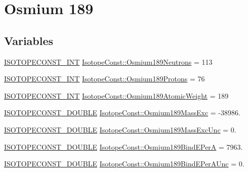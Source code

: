 \hypertarget{group___isotope_const-_osmium-_os189}{}\section{Osmium 189}
\label{group___isotope_const-_osmium-_os189}
\subsection*{Variables}
\begin{DoxyCompactItemize}
\item 
\mbox{\hyperlink{group___isotope_const-_macros_ga5f18360b3e99483a35c32d789e62621c}{I\+S\+O\+T\+O\+P\+E\+C\+O\+N\+S\+T\+\_\+\+I\+NT}} \mbox{\hyperlink{group___isotope_const-_osmium-_os189_ga614f106c85c2f993f44752e0599b8a3b}{Isotope\+Const\+::\+Osmium189\+Neutrons}} = 113
\item 
\mbox{\hyperlink{group___isotope_const-_macros_ga5f18360b3e99483a35c32d789e62621c}{I\+S\+O\+T\+O\+P\+E\+C\+O\+N\+S\+T\+\_\+\+I\+NT}} \mbox{\hyperlink{group___isotope_const-_osmium-_os189_gaf9f5bd5e9282b766e0f7093c3b1373fa}{Isotope\+Const\+::\+Osmium189\+Protons}} = 76
\item 
\mbox{\hyperlink{group___isotope_const-_macros_ga5f18360b3e99483a35c32d789e62621c}{I\+S\+O\+T\+O\+P\+E\+C\+O\+N\+S\+T\+\_\+\+I\+NT}} \mbox{\hyperlink{group___isotope_const-_osmium-_os189_gab9368781bf89b64751f0ea99820edcc1}{Isotope\+Const\+::\+Osmium189\+Atomic\+Weight}} = 189
\item 
\mbox{\hyperlink{group___isotope_const-_macros_ga8f45a7272ce02c0b4c65c44636ed719a}{I\+S\+O\+T\+O\+P\+E\+C\+O\+N\+S\+T\+\_\+\+D\+O\+U\+B\+LE}} \mbox{\hyperlink{group___isotope_const-_osmium-_os189_gacff2108370c6807985de9f4b520b8c10}{Isotope\+Const\+::\+Osmium189\+Mass\+Exc}} = -\/38986.
\item 
\mbox{\hyperlink{group___isotope_const-_macros_ga8f45a7272ce02c0b4c65c44636ed719a}{I\+S\+O\+T\+O\+P\+E\+C\+O\+N\+S\+T\+\_\+\+D\+O\+U\+B\+LE}} \mbox{\hyperlink{group___isotope_const-_osmium-_os189_ga867b92e711ab05c77edcaca2c8161d0b}{Isotope\+Const\+::\+Osmium189\+Mass\+Exc\+Unc}} = 0.
\item 
\mbox{\hyperlink{group___isotope_const-_macros_ga8f45a7272ce02c0b4c65c44636ed719a}{I\+S\+O\+T\+O\+P\+E\+C\+O\+N\+S\+T\+\_\+\+D\+O\+U\+B\+LE}} \mbox{\hyperlink{group___isotope_const-_osmium-_os189_ga97f1d7e47056adb35fe27a54ad9e539a}{Isotope\+Const\+::\+Osmium189\+Bind\+E\+PerA}} = 7963.
\item 
\mbox{\hyperlink{group___isotope_const-_macros_ga8f45a7272ce02c0b4c65c44636ed719a}{I\+S\+O\+T\+O\+P\+E\+C\+O\+N\+S\+T\+\_\+\+D\+O\+U\+B\+LE}} \mbox{\hyperlink{group___isotope_const-_osmium-_os189_gaa5a06e7a8a8cbfe4ba12fd05416542cd}{Isotope\+Const\+::\+Osmium189\+Bind\+E\+Per\+A\+Unc}} = 0.

\end{DoxyCompactItemize}
